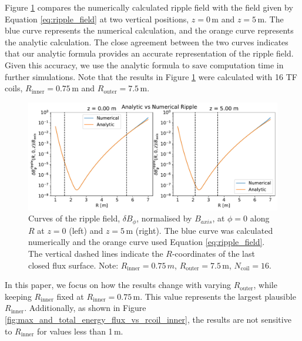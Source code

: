 \documentclass[10pt, a4paper, twoside]{article}
\begin{document}
Figure \ref{fig:ripple_check} compares the numerically calculated ripple field with the field given by Equation \eqref{eq:ripple_field} at two vertical positions, \( z = 0 \, \text{m} \) and \( z = 5 \, \text{m} \). The blue curve represents the numerical calculation, and the orange curve represents the analytic calculation. The close agreement between the two curves indicates that our analytic formula provides an accurate representation of the ripple field. Given this accuracy, we use the analytic formula to save computation time in further simulations. Note that the results in Figure \ref{fig:ripple_check} were calculated with 16 TF coils, \( R_{\text{inner}} = 0.75\, \text{m} \) and \( R_{\text{outer}} = 7.5\, \text{m} \).

\begin{figure}[h!]
    \centering
    \includegraphics[width=0.99\linewidth]{Figures/ripple_check.pdf}
    \caption{Curves of the ripple field, \( \delta B_\phi \), normalised by \( B_{axis} \), at \( \phi = 0 \) along \( R \) at \( z = 0 \) (left) and \( z = 5\, \text{m} \) (right). The blue curve was calculated numerically and the orange curve used Equation \eqref{eq:ripple_field}. The vertical dashed lines indicate the \( R \)-coordinates of the last closed flux surface. Note: \(R_\text{inner} = 0.75\, \si{m}\), \( R_{\text{outer}} = 7.5\, \text{m} \), \( N_{\text{coil}} = 16 \).}
    \label{fig:ripple_check}
\end{figure}

In this paper, we focus on how the results change with varying \( R_\text{outer} \), while keeping \( R_\text{inner} \) fixed at \( R_\text{inner}=0.75\,\text{m} \). This value represents the largest plausible \( R_\text{inner} \). Additionally, as shown in Figure \ref{fig:max_and_total_energy_flux_vs_rcoil_inner}, the results are not sensitive to \( R_\text{inner} \) for values less than 1\,m.
\end{document}
